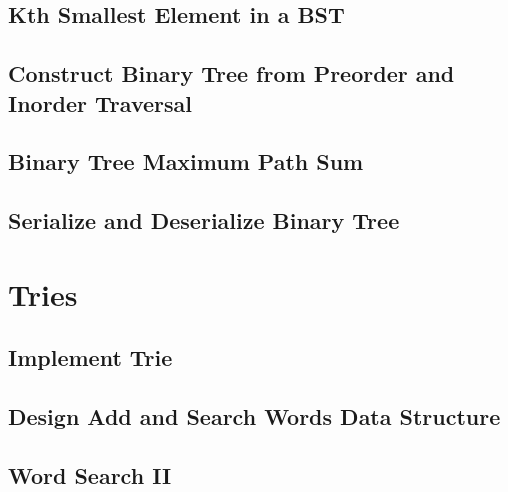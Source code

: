 \documentclass[12pt,letterpaper]{book}
\theoremstyle{definition}
\theoremstyle{remark}
\begin{document}

\section{Kth Smallest Element in a BST}


\section{Construct Binary Tree from Preorder and Inorder Traversal}


\section{Binary Tree Maximum Path Sum}


\section{Serialize and Deserialize Binary Tree}


\chapter{Tries}

\section{Implement Trie}


\section{Design Add and Search Words Data Structure}


\section{Word Search II}

\end{document}
